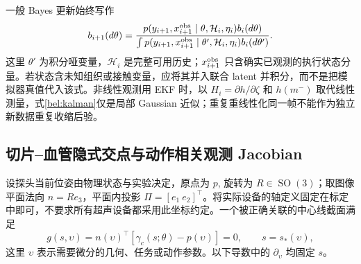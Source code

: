 \documentclass[11pt,a4paper]{article}
\numberwithin{equation}{section}
\theoremstyle{definition}
\DeclareMathOperator{\SO}{SO}
\begin{document}
一般 Bayes 更新始终写作
\begin{equation}
 b_{i+1}(d\theta)
 =\frac{p(y_{i+1},x^{\rm obs}_{i+1}\mid\theta,\mathcal H_i,\eta_i)
 b_i(d\theta)}
 {\int p(y_{i+1},x^{\rm obs}_{i+1}\mid\theta',\mathcal H_i,\eta_i)b_i(d\theta')}.
 \label{bel:bayes}
\end{equation}
这里 $\theta'$ 为积分哑变量，$\mathcal H_i$ 是完整可用历史；$x^{\rm obs}_{i+1}$ 只含确实已观测的执行状态分量。若状态含未知组织或接触变量，应将其并入联合 latent 并积分，而不是把模拟器真值代入该式。非线性观测用 EKF 时，以 $H_i=\partial h/\partial\zeta$ 和 $h(m^-)$ 取代线性测量，式\eqref{bel:kalman}仅是局部 Gaussian 近似；重复重线性化同一帧不能作为独立新数据重复收缩后验。

\subsection{切片--血管隐式交点与动作相关观测 Jacobian}
\label{bel:vessel-observation}

设探头当前位姿由物理状态与实验决定，原点为 $p$, 旋转为 $R\in\SO(3)$；取图像平面法向 $n=Re_3$，平面内投影 $\Pi=[e_1\ e_2]^\top$。将实际设备的轴定义固定在标定中即可，不要求所有超声设备都采用此坐标约定。一个被正确关联的中心线截面满足
\begin{equation}
 g(s,\upsilon)=n(\upsilon)^\top[\gamma_c(s;\theta)-p(\upsilon)]=0,
 \qquad s=s_*(\upsilon),
 \label{bel:plane-root}
\end{equation}
这里 $\upsilon$ 表示需要微分的几何、任务或动作参数。以下导数中的 $\partial_{\upsilon}$ 均固定 $s$。
\end{document}
